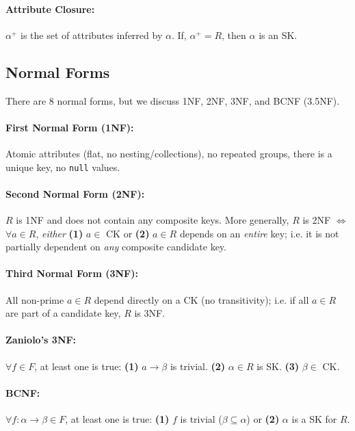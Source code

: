 \documentclass{report}
\renewcommand{\bf}[1]{\textbf{{#1}}}
\renewcommand{\tt}[1]{\texttt{{#1}}}
\renewcommand{\it}[1]{\textit{{#1}}}
\begin{document}
\paragraph{Attribute Closure:}
$\alpha^+$ is the set of attributes inferred by $\alpha$. If, $\alpha^+ = R$,
then $\alpha$ is an SK.

\subsection{Normal Forms}
There are 8 normal forms, but we discuss 1NF, 2NF, 3NF, and BCNF (3.5NF).
\paragraph{First Normal Form (1NF):} Atomic attributes (flat, no
nesting/collections), no repeated groups, there is a unique key, no \tt{null}
values.

\paragraph{Second Normal Form (2NF):} $R$ is 1NF and does not contain any
composite keys. More generally, $R$ is 2NF $\iff$ $\forall a \in R$, \it{either}
\bf{(1)} $a \in$ CK or \bf{(2)} $a \in R$ depends on an \it{entire} key; i.e. it
is not partially dependent on \it{any} composite candidate key.

\paragraph{Third Normal Form (3NF):} All non-prime $a \in R$ depend directly on
a CK (no transitivity); i.e. if all $a \in R$ are part of a candidate key, $R$
is 3NF.

\paragraph{Zaniolo's 3NF:} $\forall f \in F$, at least one is true: \bf{(1)}
$a \to \beta$ is trivial. \bf{(2)} $\alpha \in R$ is SK. \bf{(3)} $\beta \in$ CK.

\paragraph{BCNF:} $\forall f : \alpha \to \beta \in F$, at least one is true:
\bf{(1)} $f$ is trivial ($\beta \subseteq \alpha$) or \bf{(2)} $\alpha$ is a SK
for $R$.
\end{document}
